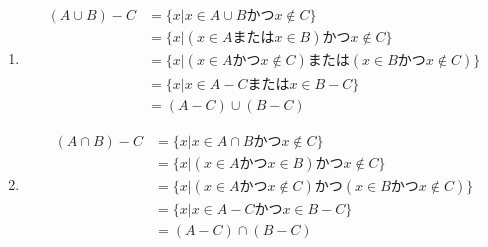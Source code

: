 \documentclass{jsarticle}
\begin{document}
\subsection{}
\begin{enumerate}
\item
\begin{align*}
(A\cup B)-C &= \{x | x \in A\cup B かつ x\notin C\}\\
&=\{x| (x \in A または x\in B) かつ x\notin C\}\\
&=\{x| (x\in A かつ x\notin C) または (x\in B かつ x\notin C)\}\\
&=\{x| x\in A-C または x\in B-C\}\\
&=(A-C)\cup (B-C)
\end{align*}

\item
\begin{align*}
(A\cap B)-C &= \{x | x \in A\cap B かつ x\notin C\}\\
&=\{x| (x \in A かつ x\in B) かつ x\notin C\}\\
&=\{x| (x\in A かつ x\notin C) かつ (x\in B かつ x\notin C)\}\\
&=\{x| x\in A-C かつ x\in B-C\}\\
&=(A-C)\cap (B-C)
\end{align*}

\end{enumerate}
\end{document}
